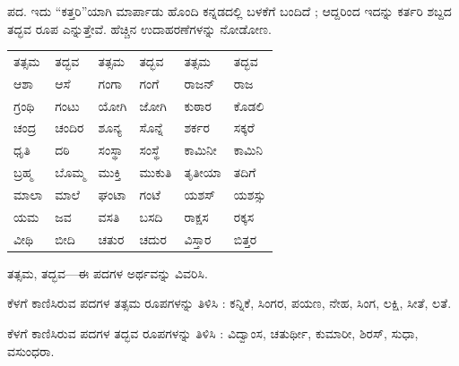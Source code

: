 \kbvcontinued ಪದ. ಇದು “ಕತ್ತರಿ”ಯಾಗಿ ಮಾರ್ಪಾಡು ಹೊಂದಿ ಕನ್ನಡದಲ್ಲಿ ಬಳಕೆಗೆ ಬಂದಿದೆ ; ಆದ್ದರಿಂದ ಇದನ್ನು ಕರ್ತರಿ ಶಬ್ದದ ತದ್ಭವ ರೂಪ ಎನ್ನುತ್ತೇವೆ. ಹೆಚ್ಚಿನ ಉದಾಹರಣೆಗಳನ್ನು ನೋಡೋಣ.\par

\vspace{5pt plus 4pt minus 1pt}
\begin{center}
{\renewcommand{\arraystretch}{1.22}\setlength{\tabcolsep}{5.5pt}
\begin{tabularx}{\textwidth}{X X | X X | X X}
{\kbvsecfont ತತ್ಸಮ} & {\kbvsecfont ತದ್ಭವ} & {\kbvsecfont ತತ್ಸಮ} & {\kbvsecfont ತದ್ಭವ} & {\kbvsecfont ತತ್ಸಮ} & {\kbvsecfont ತದ್ಭವ} \\[3pt]
ಆಶಾ & ಆಸೆ & ಗಂಗಾ & ಗಂಗೆ & ರಾಜನ್‌ & ರಾಜ \\
ಗ್ರಂಥಿ & ಗಂಟು & ಯೋಗಿ & ಜೋಗಿ & ಕುಠಾರ & ಕೊಡಲಿ \\
ಚಂದ್ರ & ಚಂದಿರ & ಶೂನ್ಯ & ಸೊನ್ನೆ & ಶರ್ಕರ & ಸಕ್ಕರೆ \\
ಧೃತಿ & ದಠಿ & ಸಂಸ್ಥಾ & ಸಂಸ್ಥೆ & ಕಾಮಿನೀ & ಕಾಮಿನಿ \\
ಬ್ರಹ್ಮ & ಬೊಮ್ಮ & ಮುಕ್ತಿ & ಮುಕುತಿ & ತೃತೀಯಾ & ತದಿಗೆ \\
ಮಾಲಾ & ಮಾಲೆ & ಘಂಟಾ & ಗಂಟೆ & ಯಶಸ್ & ಯಶಸ್ಸು \\
ಯಮ & ಜವ & ವಸತಿ & ಬಸದಿ & ರಾಕ್ಷಸ & ರಕ್ಕಸ \\
ವೀಥಿ & ಬೀದಿ & ಚತುರ & ಚದುರ & ವಿಸ್ತಾರ & ಬಿತ್ತರ \\
\end{tabularx}}
\end{center}
\vspace{5pt plus 4pt minus 1pt}


\vspace{2.5pt plus 3pt minus 0.5pt}\noindent\hspace*{1.2em}\hspace{0.55em}ತತ್ಸಮ, ತದ್ಭವ—ಈ ಪದಗಳ ಅರ್ಥವನ್ನು ವಿವರಿಸಿ.\par

\vspace{2.5pt plus 3pt minus 0.5pt}\noindent\hspace*{1.2em}\hspace{0.55em}ಕೆಳಗೆ ಕಾಣಿಸಿರುವ ಪದಗಳ ತತ್ಸಮ ರೂಪಗಳನ್ನು ತಿಳಿಸಿ : ಕನ್ನಿಕೆ, ಸಿಂಗರ, ಪಯಣ, ನೇಹ, ಸಿಂಗ, ಲಕ್ಷಿ, ಸೀತೆ, ಲತೆ.\par

\vspace{2.5pt plus 3pt minus 0.5pt}\noindent\hspace*{1.2em}\hspace{0.55em}ಕೆಳಗೆ ಕಾಣಿಸಿರುವ ಪದಗಳ ತದ್ಭವ ರೂಪಗಳನ್ನು ತಿಳಿಸಿ : ವಿದ್ವಾಂಸ, ಚತುರ್ಥೀ, ಕುಮಾರೀ, ಶಿರಸ್, ಸುಧಾ, ವಸುಂಧರಾ.\par

